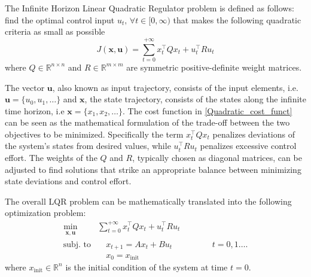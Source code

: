 \documentclass[a4paper,12pt,oneside]{book}
\begin{document}
\bigskip
The Infinite Horizon Linear Quadratic Regulator problem is defined as follows:
find the optimal control input $u_t, \, \forall t \in [0, \infty)$ that makes the following quadratic criteria as small as possible
\begin{equation}
    J(\boldsymbol{x}, \boldsymbol{u})  = \sum_{t=0} ^{+\infty} x_t^\top Q x_t + u_t ^\top R u_t
\label{Quadratic_cost_funct}
\end{equation}
where $Q \in \mathbb{R}^{n \times n}$ and $R \in \mathbb{R}^{m \times m}$ are symmetric positive-definite weight matrices.

The vector $\boldsymbol{u}$, also known as input trajectory, consists of the input elements, i.e. $\boldsymbol{u} = \{u_0, u_1, \dots\}$ and $\boldsymbol{x}$, the state trajectory, consists of the states along the infinite time horizon, i.e $\boldsymbol{x} = \{x_1, x_2, \dots\}$.
The cost function in \eqref{Quadratic_cost_funct} can be seen as the mathematical formulation of the trade-off between the two objectives to be minimized.
Specifically the term $x_t^\top Q x_t$ penalizes deviations of the system's states from desired values, while $u_t^\top R u_t$ penalizes excessive control effort.
The weights of the $Q$ and $R$, typically chosen as diagonal matrices, can be adjusted to find solutions that strike an appropriate balance between minimizing state deviations and control effort.

\bigskip
The overall LQR problem can be mathematically translated into the following optimization problem:
\begin{equation}
\begin{aligned}
	\min_{\substack{\boldsymbol{x}, \boldsymbol{u}}}\quad & \sum_{t=0}^{+\infty}  x_t ^\top Q x_t  + u_t^\top R u_t  \\
	\text{subj. to} & \quad x_{t+1}  = A x_t + B u_t \hspace{2cm} t = 0, 1 \ldots. \\
    & \quad x_0 = x_{\text{init}}
\end{aligned}
\label{eq:LQR_1}
\end{equation}
where  $x_{\text{init}} \in \mathbb{R}^n$ is the initial condition of the system at time $t=0$.
\end{document}
